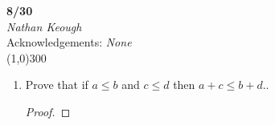 \documentclass[a4paper]{article}
\begin{document}
    \begin{center}
        \Large \textbf{8/30} \\
        \large \textit{Nathan Keough} \\
        Acknowledgements: \emph{None} \vspace{.5pc} \\ \line(1,0){300} 
        \vspace{1pc}
    \end{center} 
    
    \begin{flushleft}
        \begin{enumerate}
            \item
            Prove that if $a\leq b$ and $c\leq d$ then $a+c\leq b+d$..

            \begin{proof}
                
            \end{proof}             
        \end{enumerate}
    \end{flushleft}
\end{document}
